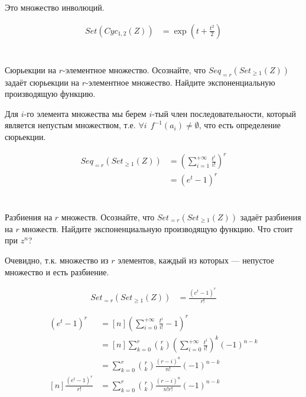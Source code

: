 Это множество инволюций.

\begin{align*}
    Set(Cyc_{1, 2}(Z)) & = \exp\left( t + \frac{t^2}{2} \right)
\end{align*}

\section{}
Сюрьекции на \(r\)-элементное множество. Осознайте, что \(Seq_{=r}(Set_{\ge 1}(Z))\) задаёт сюрьекции на \(r\)-элементное множество. Найдите экспоненциальную производящую функцию.

Для \(i\)-го элемента множества мы берем \(i\)-тый член последовательности, который является непустым множеством, т.е. \(\forall i \ \ f^{ - 1}(a_i) \neq \emptyset\), что есть определение сюрьекции.

\begin{align*}
    Seq_{ = r}(Set_{\ge 1}(Z)) & = \left( \sum_{i = 1}^{+\infty} \frac{t^i}{i!} \right)^r \\
                               & = (e^t - 1)^r
\end{align*}

\section{}
Разбиения на \(r\) множеств. Осознайте, что \(Set_{=r}(Set_{\ge 1}(Z))\) задаёт разбиения на \(r\) множеств. Найдите экспоненциальную производящую функцию. Что стоит при \(z^n\)?

Очевидно, т.к. множество из \(r\) элементов, каждый из которых --- непустое множество и есть разбиение.

\begin{align*}
    Set_{=r}(Set_{\ge 1}(Z)) & = \frac{(e^t - 1)^r}{r!}
\end{align*}

\begin{align*}
    [n](e^t - 1)^r            & = [n]\left( \sum_{i = 0}^{+\infty} \frac{t^i}{i!} - 1 \right)^r                                         \\
                              & = [n] \sum_{k = 0}^{r} \binom{r}{k} \left(\sum_{i = 0}^{+\infty} \frac{t^i}{i!}\right)^k ( - 1)^{n - k} \\
                              & = \sum_{k = 0}^{r} \binom{r}{k} \frac{(r - i)^{n}}{n!} ( - 1)^{n - k}                                   \\
    [n]\frac{(e^t - 1)^r}{r!} & = \sum_{k = 0}^{r} \binom{r}{k} \frac{(r - i)^{n}}{n!r!} ( - 1)^{n - k}                                 \\
\end{align*}

